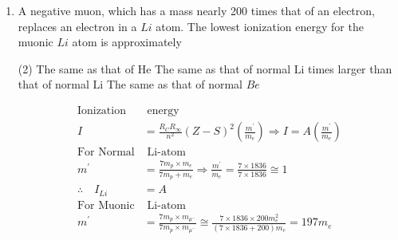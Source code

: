 \begin{enumerate}
 \begin{tasks}(4)
	\task[\textbf{a.}] $\frac{2 e \Delta V}{\hbar}$
	\task[\textbf{b.}]$\frac{e \Delta V}{\hbar}$
	\task[\textbf{c.}]$\frac{e \Delta V}{\pi \hbar}$
	\task[\textbf{d.}] $\frac{e \Delta V}{2 \pi \hbar}$
\end{tasks}
\begin{answer}$\left. \right. $
	\begin{figure}[H]
		\centering
		\texttt{[image: Net-D-19-36]}
	\end{figure}
	\begin{align*}
	\text{
	current density through thin insulating layer is }\\
	J=J_{0} \sin \left[\delta(0)-\frac{2 \rho \Delta v}{\hbar} t\right]=J_{0} \sin [\delta(0)-\omega t]\\
	\text{the angular frequency of the super current is }\therefore \omega=\frac{2 \rho \Delta v}{\hbar} 
	\end{align*}
		So the correct answer is \textbf{Option (a)}
\end{answer}
\item A negative muon, which has a mass nearly 200 times that of an electron, replaces an electron in a $L i$ atom. The lowest ionization energy for the muonic $L i$ atom is approximately
 \begin{tasks}(2)
	\task[\textbf{a.}]The same as that of He
	\task[\textbf{b.}] The same as that of normal $\mathrm{Li}$
	 times larger than that of normal $\mathrm{Li}$
	\task[\textbf{d.}] The same as that of normal $B e$
\end{tasks}
\begin{answer}
	\begin{align*}
	\text{Ionization}&\text{ energy}\\
	I&=\frac{R_{C} R_{\infty}}{n^{2}}(Z-S)^{2}\left(\frac{m^{\prime}}{m_{e}}\right) \Rightarrow I=A\left(\frac{m^{\prime}}{m_{e}}\right)\\
	\text{For Normal}&\text{ Li-atom}\\
	m^{\prime}&=\frac{7 m_{p} \times m_{e}}{7 m_{p}+m_{e}} \Rightarrow \frac{m^{\prime}}{m_{e}}=\frac{7 \times 1836}{7 \times 1836} \cong 1 \\
	\therefore \quad I_{L i}&=A\\
	\text{For Muonic}&\text{ Li-atom}\\
	m^{\prime}&=\frac{7 m_{p} \times m_{\mu^{-}}}{7 m_{p} \times m_{\mu^{-}}} \cong \frac{7 \times 1836 \times 200 m_{e}^{2}}{(7 \times 1836+200) m_{e}}=197 m_{e} \\

\end{align*}
\end{answer}
\end{enumerate}
